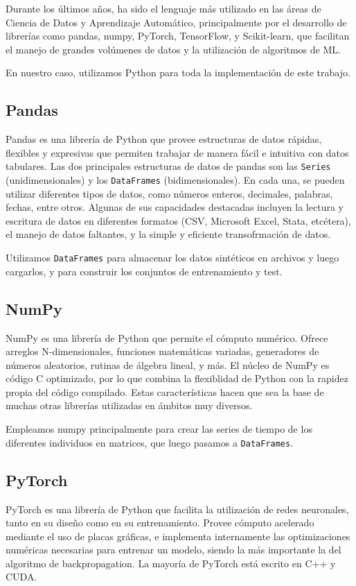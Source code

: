 \documentclass[../../main.tex]{subfiles}
\begin{document}
Durante los últimos años, ha sido el lenguaje más utilizado en las áreas de Ciencia
de Datos y Aprendizaje Automático, principalmente por el desarrollo de librerías
como pandas, numpy, PyTorch, TensorFlow, y Scikit-learn, que facilitan el manejo
de grandes volúmenes de datos y la utilización de algoritmos de ML.

En nuestro caso, utilizamos Python para toda la implementación de este trabajo.

\subsection{Pandas}
Pandas \cite{pandas-docs} es una librería de Python que provee estructuras de datos
rápidas, flexibles y expresivas que permiten trabajar de manera fácil e intuitiva con
datos tabulares. Las dos principales estructuras de datos de pandas son las
\texttt{Series} (unidimensionales) y los \texttt{DataFrames} (bidimensionales). En cada
una, se pueden utilizar diferentes tipos de datos, como números enteros, decimales,
palabras, fechas, entre otros. Algunas de sus capacidades destacadas incluyen la lectura y
escritura de datos en diferentes formatos (CSV, Microsoft Excel, Stata, etcétera), el
manejo de datos faltantes, y la simple y eficiente transofrmación de datos.

Utilizamos \texttt{DataFrames} para almacenar los datos sintéticos en archivos y luego
cargarlos, y para construir los conjuntos de entrenamiento y test.

\subsection{NumPy}
NumPy \cite{numpy-docs} es una librería de Python que permite el cómputo numérico. Ofrece
arreglos N-dimensionales, funciones matemáticas variadas, generadores de números
aleatorios, rutinas de álgebra lineal, y más. El núcleo de NumPy es código C optimizado,
por lo que combina la flexiblidad de Python con la rapidez propia del código compilado.
Estas características hacen que sea la base de muchas otras librerías utilizadas en
ámbitos muy diversos.

Empleamos numpy principalmente para crear las series de tiempo de los diferentes
individuos en matrices, que luego pasamos a \texttt{DataFrames}.

\subsection{PyTorch}
PyTorch \cite{pytorch-docs} es una librería de Python que facilita la utilización de redes
neuronales, tanto en su diseño como en su entrenamiento. Provee cómputo acelerado mediante
el uso de placas gráficas, e implementa internamente las optimizaciones numéricas
necesarias para entrenar un modelo, siendo la más importante la del algoritmo de
backpropagation. La mayoría de PyTorch está escrito en C++ y CUDA.
\end{document}
